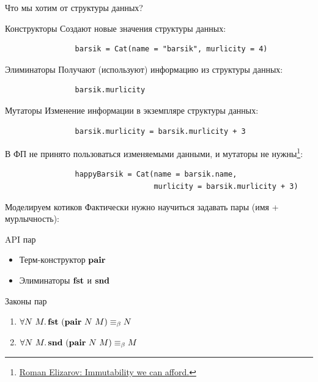     \begin{frame}[fragile]{Что мы хотим от структуры данных?}
        \pause
        \vspace{-0.5em}
        \begin{block}{Конструкторы}
            Создают новые значения структуры данных:
            \begin{verbatim}
                barsik = Cat(name = "barsik", murlicity = 4)
            \end{verbatim}
        \end{block}
        \pause
        \begin{block}{Элиминаторы}
            Получают (используют) информацию из структуры данных:
            \begin{verbatim}
                barsik.murlicity
            \end{verbatim}
        \end{block}
        \pause
        \begin{block}{Мутаторы}
            Изменение информации в экземпляре структуры данных:
            \begin{verbatim}
                barsik.murlicity = barsik.murlicity + 3
            \end{verbatim}
            \pause
            В ФП не принято пользоваться изменяемыми данными, и мутаторы не нужны\footnote{\href{https://elizarov.medium.com/immutability-we-can-afford-10c0dcb8351d}{\color{blue} Roman Elizarov: Immutability we can afford.}}:
            \begin{verbatim}
                happyBarsik = Cat(name = barsik.name,
                                  murlicity = barsik.murlicity + 3)
            \end{verbatim}
        \end{block}
    \end{frame}

    \begin{frame}[fragile]{Моделируем котиков}
        \pause
        Фактически нужно научиться задавать пары (имя + мурлычность):
        \begin{block}{API пар}
            \begin{itemize}
                \item Терм-конструктор $\mathbf{pair}$
                \item Элиминаторы $\mathbf{fst}$ и $\mathbf{snd}$
            \end{itemize}
        \end{block}
        \pause
        \begin{block}{Законы пар}
            \begin{enumerate}
                \item $\forall N~M\ldotp \mathbf{fst}~(\mathbf{pair}~N~M) \equiv_\beta N$
                \item $\forall N~M\ldotp \mathbf{snd}~(\mathbf{pair}~N~M) \equiv_\beta M$
            \end{enumerate}
        \end{block}
    \end{frame}

